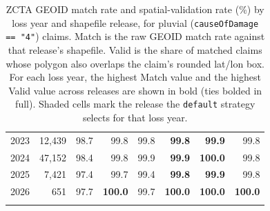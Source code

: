 {\begin{longtable}{rrrrrrrr}
2023 & 12,439 & 98.7 & 99.8 & 99.8 & \textbf{99.8} & \cellcolor{gray!15}\textbf{99.9} & \cellcolor{gray!15}99.8 \\
2024 & 47,152 & 98.4 & 99.8 & 99.9 & \textbf{99.9} & \cellcolor{gray!15}\textbf{100.0} & \cellcolor{gray!15}99.8 \\
2025 & 7,421 & 97.4 & 99.7 & 99.4 & \textbf{99.8} & \cellcolor{gray!15}\textbf{99.9} & \cellcolor{gray!15}99.8 \\
2026 & 651 & 97.7 & \textbf{100.0} & 99.7 & \textbf{100.0} & \cellcolor{gray!15}\textbf{100.0} & \cellcolor{gray!15}\textbf{100.0} \\
\bottomrule
\caption{ZCTA GEOID match rate and spatial-validation rate (\%) by loss year and shapefile release, for pluvial (\texttt{causeOfDamage == "4"}) claims. Match is the raw GEOID match rate against that release's shapefile. Valid is the share of matched claims whose polygon also overlaps the claim's rounded lat/lon box. For each loss year, the highest Match value and the highest Valid value across releases are shown in bold (ties bolded in full). Shaded cells mark the release the \texttt{default} strategy selects for that loss year.}
\label{tab:release-match-rate-zcta}\\
\end{longtable}
}
